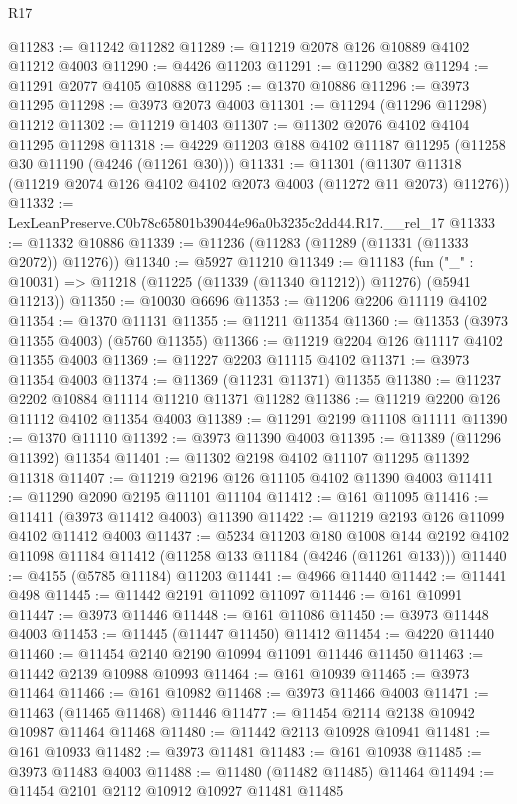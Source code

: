 \begin{lexlean}{R17}
\begin{coremodule}
@11283 := @11242 @11282
@11289 := @11219 @2078 @126 @10889 @4102 @11212 @4003
@11290 := @4426 @11203
@11291 := @11290 @382
@11294 := @11291 @2077 @4105 @10888
@11295 := @1370 @10886
@11296 := @3973 @11295
@11298 := @3973 @2073 @4003
@11301 := @11294 (@11296 @11298) @11212
@11302 := @11219 @1403
@11307 := @11302 @2076 @4102 @4104 @11295 @11298
@11318 := @4229 @11203 @188 @4102 @11187 @11295 (@11258 @30 @11190 (@4246 (@11261 @30)))
@11331 := @11301
    (@11307 @11318 (@11219 @2074 @126 @4102 @4102 @2073 @4003 (@11272 @11 @2073) @11276))
@11332 := LexLeanPreserve.C0b78c65801b39044e96a0b3235c2dd44.R17.__rel_17
@11333 := @11332 @10886
@11339 := @11236 (@11283 (@11289 (@11331 (@11333 @2072)) @11276))
@11340 := @5927 @11210
@11349 := @11183
    (fun ("_" : @10031) => @11218 (@11225 (@11339 (@11340 @11212)) @11276) (@5941 @11213))
@11350 := @10030 @6696
@11353 := @11206 @2206 @11119 @4102
@11354 := @1370 @11131
@11355 := @11211 @11354
@11360 := @11353 (@3973 @11355 @4003) (@5760 @11355)
@11366 := @11219 @2204 @126 @11117 @4102 @11355 @4003
@11369 := @11227 @2203 @11115 @4102
@11371 := @3973 @11354 @4003
@11374 := @11369 (@11231 @11371) @11355
@11380 := @11237 @2202 @10884 @11114 @11210 @11371 @11282
@11386 := @11219 @2200 @126 @11112 @4102 @11354 @4003
@11389 := @11291 @2199 @11108 @11111
@11390 := @1370 @11110
@11392 := @3973 @11390 @4003
@11395 := @11389 (@11296 @11392) @11354
@11401 := @11302 @2198 @4102 @11107 @11295 @11392 @11318
@11407 := @11219 @2196 @126 @11105 @4102 @11390 @4003
@11411 := @11290 @2090 @2195 @11101 @11104
@11412 := @161 @11095
@11416 := @11411 (@3973 @11412 @4003) @11390
@11422 := @11219 @2193 @126 @11099 @4102 @11412 @4003
@11437 := @5234
    @11203
    @180
    @1008
    @144
    @2192
    @4102
    @11098
    @11184
    @11412
    (@11258 @133 @11184 (@4246 (@11261 @133)))
@11440 := @4155 (@5785 @11184) @11203
@11441 := @4966 @11440
@11442 := @11441 @498
@11445 := @11442 @2191 @11092 @11097
@11446 := @161 @10991
@11447 := @3973 @11446
@11448 := @161 @11086
@11450 := @3973 @11448 @4003
@11453 := @11445 (@11447 @11450) @11412
@11454 := @4220 @11440
@11460 := @11454 @2140 @2190 @10994 @11091 @11446 @11450
@11463 := @11442 @2139 @10988 @10993
@11464 := @161 @10939
@11465 := @3973 @11464
@11466 := @161 @10982
@11468 := @3973 @11466 @4003
@11471 := @11463 (@11465 @11468) @11446
@11477 := @11454 @2114 @2138 @10942 @10987 @11464 @11468
@11480 := @11442 @2113 @10928 @10941
@11481 := @161 @10933
@11482 := @3973 @11481
@11483 := @161 @10938
@11485 := @3973 @11483 @4003
@11488 := @11480 (@11482 @11485) @11464
@11494 := @11454 @2101 @2112 @10912 @10927 @11481 @11485

\end{coremodule}
\end{lexlean}
